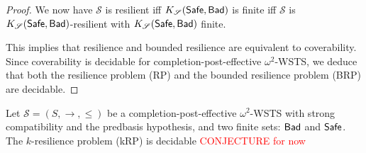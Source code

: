 \begin{proof}
%
We now have $\mathscr{S}$ is resilient iff $K_{\mathscr{S}}(\textsf{Safe},\textsf{Bad})$ is finite iff $\mathscr{S}$ is $K_{\mathscr{S}}(\textsf{Safe},\textsf{Bad})$-resilient with $K_{\mathscr{S}}(\textsf{Safe},\textsf{Bad})$ finite.

This implies that resilience and bounded resilience are equivalent to coverability.
%
%
%
%
Since coverability is decidable for completion-post-effective $\omega^2$-WSTS, we deduce that both the 
  resilience problem (RP) and the bounded resilience problem (BRP) are decidable.

\iffalse
	\end{proof}

	\begin{theorem}\label{k-down-up}
	Let $\mathscr{S}=(S,\rightarrow, \leq)$ be a completion-post-effective $\omega^2$-WSTS 
	with strong compatibility and the predbasis hypothesis, and two finite sets: $\textsf{Bad}$ 
	and $\textsf{Safe}$.
	The  $k$-resilience problem (kRP) is decidable 
	\textcolor{red}{CONJECTURE for now}
	 \end{theorem}

